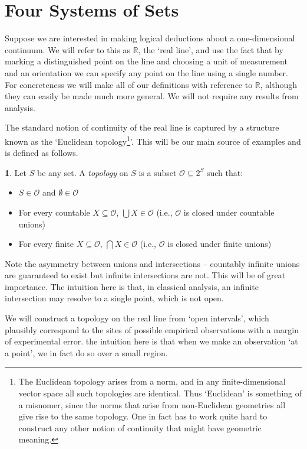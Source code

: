 \documentclass[oneside,english]{article}
\theoremstyle{plain}
\theoremstyle{definition}
\newtheorem{defn}[thm]{\protect\definitionname}
\theoremstyle{definition}
\providecommand{\definitionname}{Definition}
\begin{document}
\section{Four Systems of Sets}

Suppose we are interested in making logical deductions about a one-dimensional continuum. We will refer to this as $\mathbb{R}$, the `real line', and use the fact that by marking a distinguished point on the line and choosing a unit of measurement and an orientation we can specify any point on the line using a single number. For concreteness we will make all of our definitions with reference to $\mathbb{R}$, although they can easily be made much more general. We will not require any results from analysis.

The standard notion of continuity of the real line is captured by a structure known as the `Euclidean topology\footnote{The Euclidean topology arises from a norm, and in any finite-dimensional vector space all such topologies are identical. Thus `Euclidean' is something of a misnomer, since the norms that arise from non-Euclidean geometries all give rise to the same topology. One in fact has to work quite hard to construct any other notion of continuity that might have geometric meaning.}'. This will be our main source of examples and is defined as follows.

\begin{defn}
	Let $S$ be any set. A \emph{topology} on $S$ is a subset $\mathscr{O} \subseteq 2^S$ such that:
	\begin{itemize}
		\item $S\in\mathscr{O}$ and $\emptyset\in\mathscr{O}$
		\item For every countable $X\subseteq\mathscr{O}$, $\bigcup X\in \mathscr{O}$ (i.e., $\mathscr{O}$ is closed under countable unions)
		\item For every finite $X\subseteq\mathscr{O}$, $\bigcap X\in \mathscr{O}$ (i.e., $\mathscr{O}$ is closed under finite unions)
	\end{itemize}
\end{defn}

Note the asymmetry between unions and intersections -- countably infinite unions are guaranteed to exist but infinite intersections are not. This will be of great importance. The intuition here is that, in classical analysis, an infinite intersection may resolve to a single point, which is not open.

We will construct a topology on the real line from `open intervals', which plausibly correspond to the sites of possible empirical observations with a margin of experimental error. the intuition here is that when we make an observation `at a point', we in fact do so over a small region.
\end{document}
